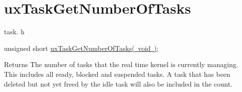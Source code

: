 \hypertarget{group__ux_task_get_number_of_tasks}{}\section{ux\+Task\+Get\+Number\+Of\+Tasks}
\label{group__ux_task_get_number_of_tasks}
task. h 
\begin{DoxyPre}unsigned short \mbox{\hyperlink{task_8h_a824dbbcd7c7fd3be20540b23ff39f2aa}{uxTaskGetNumberOfTasks( void )}};\end{DoxyPre}


\begin{DoxyReturn}{Returns}
The number of tasks that the real time kernel is currently managing. This includes all ready, blocked and suspended tasks. A task that has been deleted but not yet freed by the idle task will also be included in the count. 
\end{DoxyReturn}
